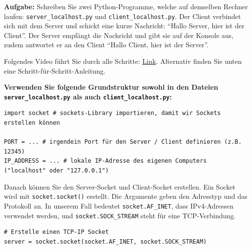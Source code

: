 

\begin{myexercise}\label{ex:chat-localhost}

    \textbf{Aufgabe:} Schreiben Sie zwei Python-Programme, welche auf demselben Rechner laufen: \texttt{server\_localhost.py} und \texttt{client\_localhost.py}. Der Client verbindet sich mit dem Server und schickt eine kurze Nachricht: \enquote{Hallo Server, hier ist der Client}. Der Server empfängt die Nachricht und gibt sie auf der Konsole aus, zudem antwortet er an den Client \enquote{Hallo Client, hier ist der Server}.

    Folgendes Video führt Sie durch alle Schritte: \href{https://youtu.be/1ECIEdc3TdA}{Link}. Alternativ finden Sie unten eine Schritt-für-Schritt-Anleitung.

    \textbf{Verwenden Sie folgende Grundstruktur sowohl in den Dateien \texttt{server\_localhost.py} als auch \texttt{client\_localhost.py}:}

    \begin{lstlisting}
import socket # sockets-Library importieren, damit wir Sockets erstellen können

PORT = ... # irgendein Port für den Server / Client definieren (z.B. 12345)
IP_ADDRESS = ... # lokale IP-Adresse des eigenen Computers ("localhost" oder "127.0.0.1")
    \end{lstlisting}

    Danach können Sie den Server-Socket und Client-Socket erstellen. Ein Socket wird mit \lstinline|socket.socket()| erstellt. Die Argumente geben den Adresstyp und das Protokoll an. In unserem Fall bedeutet \lstinline|socket.AF_INET|, dass \gls{IP}v4-Adressen verwendet werden, und \lstinline|socket.SOCK_STREAM| steht für eine \gls{TCP}-Verbindung.

    \begin{lstlisting}
# Erstelle einen TCP-IP Socket
server = socket.socket(socket.AF_INET, socket.SOCK_STREAM)
    \end{lstlisting}


\end{myexercise}
